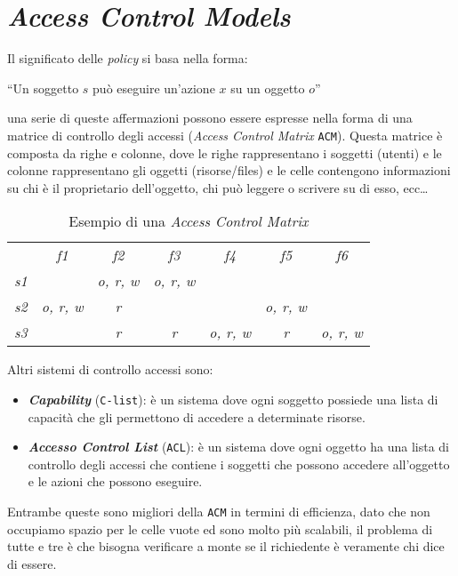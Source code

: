 \section{\textit{Access Control Models}}
    Il significato delle \textit{policy} si basa nella forma:
    \begin{oldquote}{}
        ``Un soggetto $s$ può eseguire un'azione $x$ su un oggetto $o$''
    \end{oldquote}
    una serie di queste affermazioni possono essere espresse nella forma di una matrice di controllo degli accessi (\textit{Access Control Matrix} \texttt{ACM}). Questa matrice è composta da righe e colonne, dove le righe rappresentano i soggetti (utenti) e le colonne rappresentano gli oggetti (risorse/files) e le celle contengono informazioni su chi è il proprietario dell'oggetto, chi può leggere o scrivere su di esso, ecc\dots
    \begin{table}[H]
        \centering
        \begin{tabular}{c|c|c|c|c|c|c|}
            \multicolumn{1}{c}{} & \multicolumn{1}{c}{\textit{f1}} & \multicolumn{1}{c}{\textit{f2}} & \multicolumn{1}{c}{\textit{f3}} & \multicolumn{1}{c}{\textit{f4}} & \multicolumn{1}{c}{\textit{f5}} & \multicolumn{1}{c}{\textit{f6}} \\
            \cline{2-7}
            \textit{s1} & &\textit{o, r, w} & \textit{o, r, w} &&& \\
            \cline{2-7}
            \textit{s2} & \textit{o, r, w} & \textit{r} & & & \textit{o, r, w} & \\
            \cline{2-7}
            \textit{s3} & & \textit{r} & \textit{r} & \textit{o, r, w} & \textit{r} & \textit{o, r, w} \\
            \cline{2-7}
        \end{tabular}
        \caption{Esempio di una \textit{Access Control Matrix}}
    \end{table}
    Altri sistemi di controllo accessi sono:
    \begin{itemize}
        \item \textit\textbf{Capability} (\texttt{C-list}): è un sistema dove ogni soggetto possiede una lista di capacità che gli permettono di accedere a determinate risorse. 
        \item \textit\textbf{Accesso Control List} (\texttt{ACL}): è un sistema dove ogni oggetto ha una lista di controllo degli accessi che contiene i soggetti che possono accedere all'oggetto e le azioni che possono eseguire.
    \end{itemize}
    Entrambe queste sono migliori della \texttt{ACM} in termini di efficienza, dato che non occupiamo spazio per le celle vuote ed sono molto più scalabili, il problema di tutte e tre è che bisogna verificare a monte se il richiedente è veramente chi dice di essere.

